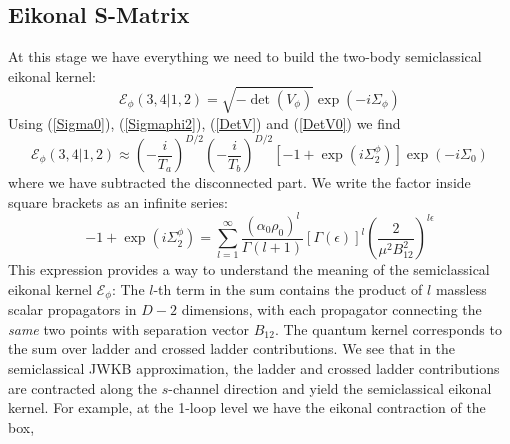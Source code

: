 \subsection{Eikonal S-Matrix\label{SMatrixMasslessSca}}
At this stage we have everything we need to build the two-body semiclassical eikonal kernel:
\begin{equation}
	\mathcal{E}_{\phi}(3,4|1,2) = \sqrt{- \det{(V_{\phi})}} \exp{\left( - i \Sigma_{\phi} \right)}
\end{equation}
Using (\ref{Sigma0}), (\ref{Sigmaphi2}), (\ref{DetV}) and (\ref{DetV0}) we find
\begin{equation}
	\mathcal{E}_{\phi}(3,4|1,2) \approx \left(- \frac{i}{T_{a}} \right)^{D/2} \left(- \frac{i}{T_{b}} \right)^{D/2} \left[ -1 + \exp{\left(i \Sigma_{2}^{\phi} \right)} \right] \exp{\left(-i \Sigma_{0} \right)} \label{EPhi3412}
\end{equation}
where we have subtracted the disconnected part. We write the factor inside square brackets as an infinite series:
\begin{equation}
	{-1} + \exp{\left(i \Sigma_{2}^{\phi} \right)} = \sum_{l = 1}^{\infty} \frac{\left( \alpha_{0} \rho_{0} \right)^{l}}{\Gamma(l + 1)} [\Gamma(\epsilon)]^{l} \left( \frac{2}{\mu^{2} B_{12}^{2}} \right)^{l \epsilon} 
\end{equation}
This expression provides a way to understand the meaning of the semiclassical eikonal kernel $\mathcal{E}_{\phi}$: The $l$-th term in the sum contains the product of $l$ massless scalar propagators in $D - 2$ dimensions, with each propagator connecting the \textit{same} two points with separation vector $B_{12}$. The quantum kernel corresponds to the sum over ladder and crossed ladder contributions. We see that in the semiclassical JWKB approximation, the ladder and crossed ladder contributions are contracted along the $s$-channel direction and yield the semiclassical eikonal kernel. For example, at the 1-loop level we have the eikonal contraction of the box,
